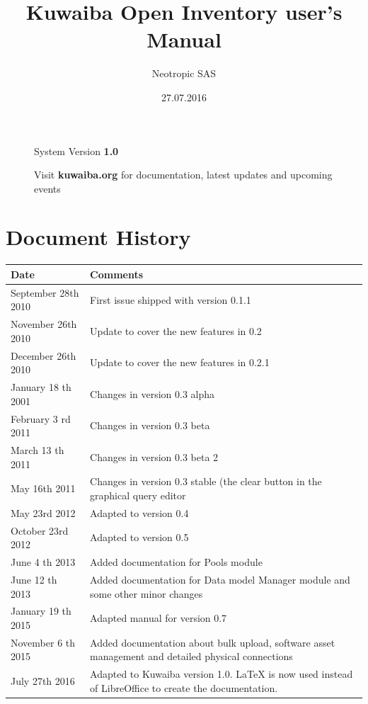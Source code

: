 \documentclass[a4paper]{article}
\title{Kuwaiba Open Inventory user's Manual}
\author{Neotropic SAS}
\date{27.07.2016}
\begin{document}
	\maketitle
	
	
	
	\begin{figure}[b]
		\centering System Version \textbf{1.0}
			
		Visit \textbf{kuwaiba.org} for documentation, latest updates and upcoming events
	\end{figure}
	
	
	\newpage
	
	\tableofcontents

	\newpage
	\section{Document History}
		\begin{table}[h!]
			\centering
			\begin{tabular}{l||p{10cm}} %
				\toprule
				\textbf{Date} & \textbf{Comments}  \\
				\midrule
				September 28th 2010 & First issue shipped with version 0.1.1\\
				\midrule
				November 26th 2010 & Update to cover the new features in 0.2 \\
				\midrule
				December 26th 2010 & Update to cover the new features in 0.2.1 \\
				\midrule
				January 18 th 2001 & Changes in version 0.3 alpha \\
				\midrule
				February 3 rd 2011 & Changes in version 0.3 beta \\
				\midrule
				March 13 th	2011 & Changes in version 0.3 beta 2 \\
				\midrule
				May 16th 2011 & Changes in version 0.3 stable (the clear button in the graphical query editor \\
				\midrule
				May 23rd 2012 & Adapted to version 0.4 \\
				\midrule
				October 23rd 2012 & Adapted to version 0.5 \\
				\midrule
				June 4 th 2013 & Added documentation	for Pools module \\
				\midrule
				June 12 th 2013 & Added documentation for Data model Manager module and some other minor changes\\
				\midrule
				January 19 th 2015 & Adapted manual for version 0.7 \\
				\midrule
				November 6 th 2015 & Added documentation about bulk upload, software asset management and detailed physical connections \\
				\midrule
				July 27th 2016 & Adapted to Kuwaiba version 1.0. LaTeX is now used instead of LibreOffice to create the documentation. \\
				\bottomrule
			\end{tabular}	
				
		\end{table}
	\newpage
\end{document}
